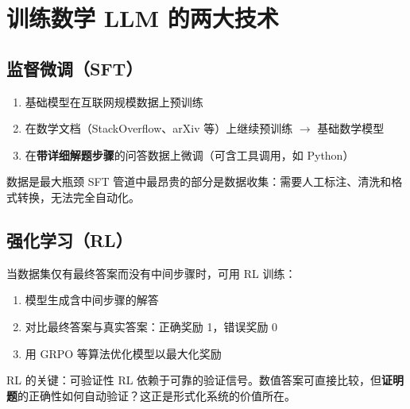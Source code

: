 \section{训练数学 LLM 的两大技术}

\subsection{监督微调（SFT）}

\begin{enumerate}
    \item 基础模型在互联网规模数据上预训练
    \item 在数学文档（StackOverflow、arXiv 等）上继续预训练 $\to$ 基础数学模型
    \item 在\textbf{带详细解题步骤}的问答数据上微调（可含工具调用，如 Python）
\end{enumerate}

\begin{warningbox}{数据是最大瓶颈}
SFT 管道中最昂贵的部分是数据收集：需要人工标注、清洗和格式转换，无法完全自动化。
\end{warningbox}

\subsection{强化学习（RL）}

当数据集仅有最终答案而没有中间步骤时，可用 RL 训练：
\begin{enumerate}
    \item 模型生成含中间步骤的解答
    \item 对比最终答案与真实答案：正确奖励 1，错误奖励 0
    \item 用 GRPO 等算法优化模型以最大化奖励
\end{enumerate}

\begin{importantbox}{RL 的关键：可验证性}
RL 依赖于可靠的验证信号。数值答案可直接比较，但\textbf{证明题}的正确性如何自动验证？这正是形式化系统的价值所在。
\end{importantbox}


